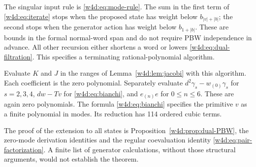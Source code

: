 The singular input rule is \eqref{w4d:eq:mode-rule}. The sum in the first term of \eqref{w4d:eq:iterate} stops when the proposed state has weight below $b_{|v|+|b|}$; the second stops when the generator action has weight below $b_{1+|b|}$. These are bounds in the formal normal-word span and do not require PBW independence in advance. All other recursion either shortens a word or lowers \eqref{w4d:eq:dual-filtration}. This specifies a terminating rational-polynomial algorithm.

Evaluate $K$ and $J$ in the ranges of Lemma~\ref{w4d:lem:jacobi} with this algorithm. Each coefficient is the zero polynomial. Separately evaluate $d^2\gamma_s-w_{(0)}\gamma_s$ for $s=2,3,4$, $dw-Tv$ for \eqref{w4d:eq:bianchi}, and $e_{(n)}e$ for $0\leq n\leq6$. These are again zero polynomials. The formula \eqref{w4d:eq:bianchi} specifies the primitive $v$ as a finite polynomial in modes. Its reduction has 114 ordered cubic terms.

The proof of the extension to all states is Proposition~\ref{w4d:prop:dual-PBW}, the zero-mode derivation identities and the regular coevaluation identity \eqref{w4d:eq:pair-factorization}. A finite list of generator calculations, without those structural arguments, would not establish the theorem.

